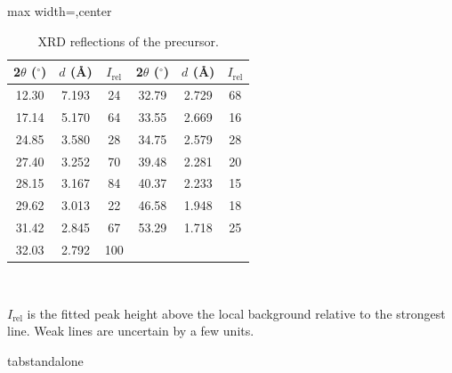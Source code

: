 \documentclass[11pt]{article}
\begin{document}
\setcounter{table}{1}
\fi\fi
\begin{table}[!htbp]
\centering
\caption{XRD reflections of the precursor.}
\label{tab:xrdp}
\scriptsize
\begin{adjustbox}{max width=\textwidth,center}
\begin{tabular}{ccc@{\hspace{16pt}}ccc}
\toprule
\textbf{2$\theta$ ($^{\circ}$)} & \textbf{$d$ (\AA)} & \textbf{$I_{\mathrm{rel}}$} & \textbf{2$\theta$ ($^{\circ}$)} & \textbf{$d$ (\AA)} & \textbf{$I_{\mathrm{rel}}$} \\
\midrule
12.30 & 7.193 & 24 & 32.79 & 2.729 & 68 \\
17.14 & 5.170 & 64 & 33.55 & 2.669 & 16 \\
24.85 & 3.580 & 28 & 34.75 & 2.579 & 28 \\
27.40 & 3.252 & 70 & 39.48 & 2.281 & 20 \\
28.15 & 3.167 & 84 & 40.37 & 2.233 & 15 \\
29.62 & 3.013 & 22 & 46.58 & 1.948 & 18 \\
31.42 & 2.845 & 67 & 53.29 & 1.718 & 25 \\
32.03 & 2.792 & 100 & & & \\
\bottomrule
\end{tabular}
\end{adjustbox}
\\[3pt]
\begin{minipage}{0.96\linewidth}
\raggedright\scriptsize $I_{\mathrm{rel}}$ is the fitted peak height above the local background relative to the strongest line. Weak lines are uncertain by a few units.
\end{minipage}
\end{table}
\expandafter\ifx\csname tabstandalone\endcsname\relax\else
\end{document}
